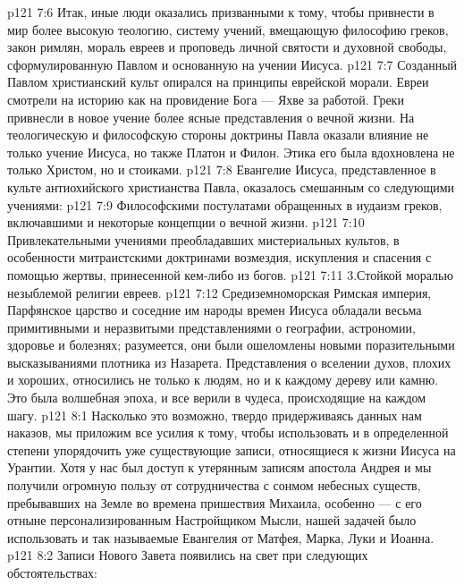 \vs p121 7:6 Итак, иные люди оказались призванными к тому, чтобы привнести в мир более высокую теологию, систему учений, вмещающую философию греков, закон римлян, мораль евреев и проповедь личной святости и духовной свободы, сформулированную Павлом и основанную на учении Иисуса.
\vs p121 7:7 \pc Созданный Павлом христианский культ опирался на принципы еврейской морали. Евреи смотрели на историю как на провидение Бога --- Яхве за работой. Греки привнесли в новое учение более ясные представления о вечной жизни. На теологическую и философскую стороны доктрины Павла оказали влияние не только учение Иисуса, но также Платон и Филон. Этика его была вдохновлена не только Христом, но и стоиками.
\vs p121 7:8 Евангелие Иисуса, представленное в культе антиохийского христианства Павла, оказалось смешанным со следующими учениями:
\vs p121 7:9 \bibnobreakspace Философскими постулатами обращенных в иудаизм греков, включавшими и некоторые концепции о вечной жизни.
\vs p121 7:10 \bibnobreakspace Привлекательными учениями преобладавших мистериальных культов, в особенности митраистскими доктринами возмездия, искупления и спасения с помощью жертвы, принесенной кем\hyp{}либо из богов.
\vs p121 7:11 3.Стойкой моралью незыблемой религии евреев.
\vs p121 7:12 \pc Средиземноморская Римская империя, Парфянское царство и соседние им народы времен Иисуса обладали весьма примитивными и неразвитыми представлениями о географии, астрономии, здоровье и болезнях; разумеется, они были ошеломлены новыми поразительными высказываниями плотника из Назарета. Представления о вселении духов, плохих и хороших, относились не только к людям, но и к каждому дереву или камню. Это была волшебная эпоха, и все верили в чудеса, происходящие на каждом шагу.
\vs p121 8:1 Насколько это возможно, твердо придерживаясь данных нам наказов, мы приложим все усилия к тому, чтобы использовать и в определенной степени упорядочить уже существующие записи, относящиеся к жизни Иисуса на Урантии. Хотя у нас был доступ к утерянным записям апостола Андрея и мы получили огромную пользу от сотрудничества с сонмом небесных существ, пребывавших на Земле во времена пришествия Михаила, особенно --- с его отныне персонализированным Настройщиком Мысли, нашей задачей было использовать и так называемые Евангелия от Матфея, Марка, Луки и Иоанна.
\vs p121 8:2 Записи Нового Завета появились на свет при следующих обстоятельствах:
